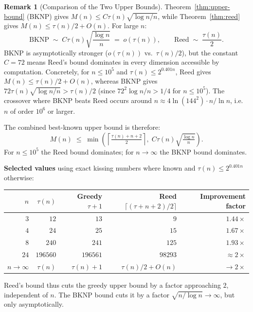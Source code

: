\documentclass{article}
\theoremstyle{definition}
\newtheorem{remark}[theorem]{Remark}
\begin{document}
\begin{remark}[Comparison of the Two Upper Bounds]\label{rem:comparison}
Theorem~\ref{thm:upper-bound} (BKNP) gives $M(n)\le C\tau(n)\sqrt{\log n/n}$, while Theorem~\ref{thm:reed} gives $M(n)\le\tau(n)/2 + O(n)$.  For large $n$:
\[
  \text{BKNP} \;\sim\; C\tau(n)\sqrt{\frac{\log n}{n}} \;=\; o(\tau(n)),
  \qquad
  \text{Reed} \;\sim\; \frac{\tau(n)}{2}.
\]
BKNP is asymptotically stronger ($o(\tau(n))$ vs.\ $\tau(n)/2$), but the constant $C=72$ means Reed's bound dominates in every dimension accessible by computation.  Concretely, for $n\le 10^5$ and $\tau(n)\le 2^{0.401n}$, Reed gives $M(n)\le\tau(n)/2+O(n)$, whereas BKNP gives $72\tau(n)\sqrt{\log n/n}>\tau(n)/2$ (since $72^2\log n/n > 1/4$ for $n\le 10^5$).  The crossover where BKNP beats Reed occurs around $n\approx 4\ln(144^2)\cdot n/\ln n$, i.e.\ $n$ of order $10^6$ or larger.

The combined best-known upper bound is therefore:
\[
  M(n)\;\le\;\min\!\left(\left\lceil\tfrac{\tau(n)+n+2}{2}\right\rceil,\;C\tau(n)\sqrt{\tfrac{\log n}{n}}\right).
\]
For $n\le 10^5$ the Reed bound dominates; for $n\to\infty$ the BKNP bound dominates.

\textbf{Selected values} using exact kissing numbers where known and $\tau(n)\le 2^{0.401n}$ otherwise:

\smallskip
\begin{center}
\begin{tabular}{r|r|r|r|r}
$n$ & $\tau(n)$ & Greedy $\tau+1$ & Reed $\lceil(\tau+n+2)/2\rceil$ & Improvement factor\\
\hline
$3$ & $12$ & $13$ & $9$ & $1.44\times$\\
$4$ & $24$ & $25$ & $15$ & $1.67\times$\\
$8$ & $240$ & $241$ & $125$ & $1.93\times$\\
$24$ & $196560$ & $196561$ & $98293$ & $\approx 2\times$\\
$n\to\infty$ & $\tau(n)$ & $\tau(n)+1$ & $\tau(n)/2+O(n)$ & $\to 2\times$\\
\end{tabular}
\end{center}
\smallskip

Reed's bound thus cuts the greedy upper bound by a factor approaching $2$, independent of $n$.  The BKNP bound cuts it by a factor $\sqrt{n/\log n}\to\infty$, but only asymptotically.
\end{remark}
\end{document}
